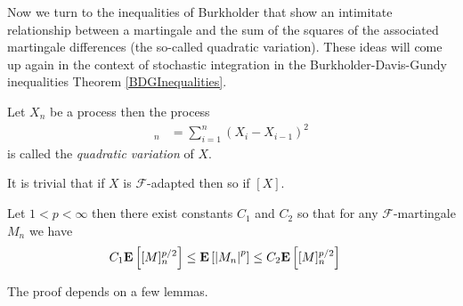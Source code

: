 Now we turn to the inequalities of Burkholder that show an intimitate
relationship between a martingale and the sum of the squares of the associated 
martingale differences (the so-called quadratic variation).  These ideas will come up again in the context of stochastic integration
in the Burkholder-Davis-Gundy inequalities Theorem \ref{BDGInequalities}.

\begin{defn}Let $X_n$ be a  process  then the process
\begin{align*}
[X]_n &= \sum_{i=1}^n (X_i - X_{i-1})^2
\end{align*}
is called the \emph{quadratic variation} of $X$.
\end{defn}

It is trivial that if $X$ is $\mathcal{F}$-adapted then so if $[X]$.

\begin{thm}\label{BurkholderInequalities}Let $1 < p < \infty$ then
there exist constants $C_1$ and $C_2$ so that for any $\mathcal{F}$-martingale 
$M_n$ we have
\begin{align*}
C_1 \textbf{E}\left[[M]_n^{p/2}\right] &\leq \textbf{E}\left[\left \vert M_n \right \vert^{p}\right] \leq C_2 \textbf{E}\left[[M]_n^{p/2}\right]
\end{align*}
\end{thm}

The proof depends on a few lemmas.

